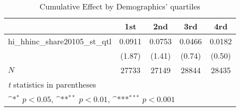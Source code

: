 \begin{table}[htbp]\centering
\def\sym#1{\ifmmode^{#1}\else\(^{#1}\)\fi}
\caption{Cumulative Effect by Demographics' quartiles}
\begin{tabular}{l*{4}{c}}
\hline\hline
            &\multicolumn{1}{c}{1st}&\multicolumn{1}{c}{2nd}&\multicolumn{1}{c}{3rd}&\multicolumn{1}{c}{4rd}\\
\hline
hi\_hhinc\_share20105\_st\_qtl&      0.0911         &      0.0753         &      0.0466         &      0.0182         \\
            &      (1.87)         &      (1.41)         &      (0.74)         &      (0.50)         \\
\hline
\(N\)       &       27733         &       27149         &       28844         &       28435         \\
\hline\hline
\multicolumn{5}{l}{\footnotesize \textit{t} statistics in parentheses}\\
\multicolumn{5}{l}{\footnotesize \sym{*} \(p<0.05\), \sym{**} \(p<0.01\), \sym{***} \(p<0.001\)}\\
\end{tabular}
\end{table}
